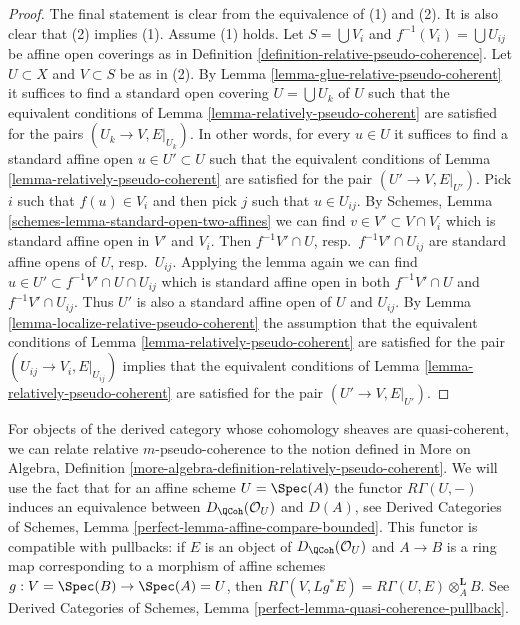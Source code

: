 \begin{proof}
The final statement is clear from the equivalence of (1) and (2).
It is also clear that (2) implies (1). Assume (1) holds.
Let $S = \bigcup V_i$ and $f^{-1}(V_i) = \bigcup U_{ij}$ be
affine open coverings as in
Definition \ref{definition-relative-pseudo-coherence}.
Let $U \subset X$ and $V \subset S$ be as in (2).
By Lemma \ref{lemma-glue-relative-pseudo-coherent}
it suffices to find a standard open covering $U = \bigcup U_k$ of $U$
such that the equivalent conditions of
Lemma \ref{lemma-relatively-pseudo-coherent}
are satisfied for the pairs $(U_k \to V, E|_{U_k})$.
In other words, for every $u \in U$ it suffices
to find a standard affine open $u \in U' \subset U$ such that
the equivalent conditions of
Lemma \ref{lemma-relatively-pseudo-coherent}
are satisfied for the pair $(U' \to V, E|_{U'})$.
Pick $i$ such that $f(u) \in V_i$ and then pick $j$ such that
$u \in U_{ij}$. By
Schemes, Lemma \ref{schemes-lemma-standard-open-two-affines}
we can find $v \in V' \subset V \cap V_i$ which is standard affine
open in $V'$ and $V_i$. Then $f^{-1}V'  \cap U$, resp.\ $f^{-1}V' \cap U_{ij}$
are standard affine opens of $U$, resp.\ $U_{ij}$.
Applying the lemma again we can find
$u \in U' \subset f^{-1}V' \cap U \cap U_{ij}$ which is standard affine
open in both $f^{-1}V'  \cap U$ and $f^{-1}V' \cap U_{ij}$.
Thus $U'$ is also a standard affine open of $U$ and $U_{ij}$.
By Lemma \ref{lemma-localize-relative-pseudo-coherent}
the assumption that the equivalent conditions of
Lemma \ref{lemma-relatively-pseudo-coherent}
are satisfied for the pair $(U_{ij} \to V_i, E|_{U_{ij}})$
implies that the equivalent conditions of
Lemma \ref{lemma-relatively-pseudo-coherent}
are satisfied for the pair $(U' \to V, E|_{U'})$.
\end{proof}

\noindent
For objects of the derived category whose cohomology sheaves are
quasi-coherent, we can relate relative $m$-pseudo-coherence
to the notion defined in More on Algebra, Definition
\ref{more-algebra-definition-relatively-pseudo-coherent}.
We will use the fact that for an affine scheme
$U = \Spec(A)$ the functor $R\Gamma(U, -)$ induces an equivalence
between $D_\QCoh(\mathcal{O}_U)$ and $D(A)$, see
Derived Categories of Schemes, Lemma
\ref{perfect-lemma-affine-compare-bounded}.
This functor is compatible with pullbacks:
if $E$ is an object of $D_\QCoh(\mathcal{O}_U)$
and $A \to B$ is a ring map corresponding to a morphism of affine
schemes $g : V = \Spec(B) \to \Spec(A) = U$, then
$R\Gamma(V, Lg^*E) = R\Gamma(U, E) \otimes_A^\mathbf{L} B$.
See Derived Categories of Schemes, Lemma
\ref{perfect-lemma-quasi-coherence-pullback}.

